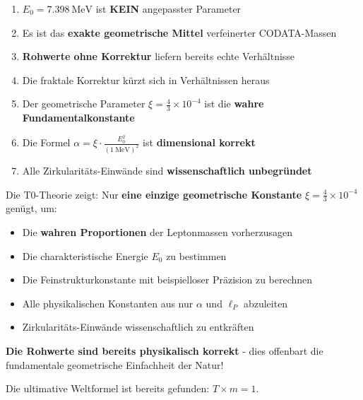 \documentclass[12pt,a4paper]{article}
\theoremstyle{definition}
\begin{document}
	\begin{tcolorbox}[colback=red!5!white,colframe=red!75!black,title=Vollst\"andige Zusammenfassung]
		\begin{enumerate}
			\item $E_0 = \SI{7.398}{\MeV}$ ist \textbf{KEIN} angepasster Parameter
			\item Es ist das \textbf{exakte geometrische Mittel} verfeinerter CODATA-Massen
			\item \textbf{Rohwerte ohne Korrektur} liefern bereits echte Verh\"altnisse
			\item Die fraktale Korrektur k\"urzt sich in Verh\"altnissen heraus
			\item Der geometrische Parameter $\xi = \frac{4}{3} \times 10^{-4}$ ist die \textbf{wahre Fundamentalkonstante}
			\item Die Formel $\alpha = \xi \cdot \frac{E_0^2}{( \SI{1}{\MeV} )^2}$ ist \textbf{dimensional korrekt}
			\item Alle Zirkularit\"ats-Einw\"ande sind \textbf{wissenschaftlich unbegr\"undet}
		\end{enumerate}
	\end{tcolorbox}
	
	\vspace{1cm}
	
	\begin{tcolorbox}[colback=green!10!white,colframe=green!75!black,title=Die ultimative Revolution\"are Erkenntnis]
		Die T0-Theorie zeigt: Nur \textbf{eine einzige geometrische Konstante} $\xi = \frac{4}{3} \times 10^{-4}$ gen\"ugt, um:
		
		\begin{itemize}
			\item Die \textbf{wahren Proportionen} der Leptonmassen vorherzusagen
			\item Die charakteristische Energie $E_0$ zu bestimmen  
			\item Die Feinstrukturkonstante mit beispielloser Pr\"azision zu berechnen
			\item Alle physikalischen Konstanten aus nur $\alpha$ und $\ell_P$ abzuleiten
			\item Zirkularit\"ats-Einw\"ande wissenschaftlich zu entkr\"aften
		\end{itemize}
		
		\textbf{Die Rohwerte sind bereits physikalisch korrekt} - dies offenbart die fundamentale geometrische Einfachheit der Natur!
		
		\vspace{0.5cm}
		Die ultimative Weltformel ist bereits gefunden: $T \times m = 1$.
	\end{tcolorbox}
	
\end{document}
